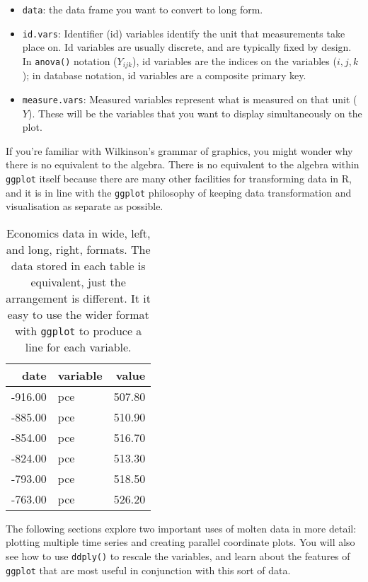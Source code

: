 \begin{itemize}
\itemsep1pt\parskip0pt
\item
  \texttt{data}: the data frame you want to convert to long form.
\item
  \texttt{id.vars}: Identifier (id) variables identify the unit that
  measurements take place on. Id variables are usually discrete, and are
  typically fixed by design. In \texttt{anova()} notation (\(Y_{ijk}\)),
  id variables are the indices on the variables (\(i, j, k\)); in
  database notation, id variables are a composite primary key.
\item
  \texttt{measure.vars}: Measured variables represent what is measured
  on that unit (\(Y\)). These will be the variables that you want to
  display simultaneously on the plot.
\end{itemize}

If you're familiar with Wilkinson's grammar of graphics, you might
wonder why there is no equivalent to the algebra. There is no equivalent
to the algebra within \texttt{ggplot} itself because there are many
other facilities for transforming data in R, and it is in line with the
\texttt{ggplot} philosophy of keeping data transformation and
visualisation as separate as possible.

\begin{table}[ht]
\centering
\begin{tabular}{rlr}
  \hline
date & variable & value \\ 
  \hline
-916.00 & pce & 507.80 \\ 
  -885.00 & pce & 510.90 \\ 
  -854.00 & pce & 516.70 \\ 
  -824.00 & pce & 513.30 \\ 
  -793.00 & pce & 518.50 \\ 
  -763.00 & pce & 526.20 \\ 
   \hline
\end{tabular}
\caption{Economics data in wide, left, and long, right, formats. The data stored in each table is equivalent, just the arrangement is different. It it easy to use the wider format with \texttt{ggplot} to produce a line for each variable.} 
\label{melt}
\end{table}

The following sections explore two important uses of molten data in more
detail: plotting multiple time series and creating parallel coordinate
plots. You will also see how to use \texttt{ddply()} to rescale the
variables, and learn about the features of \texttt{ggplot} that are most
useful in conjunction with this sort of data.

